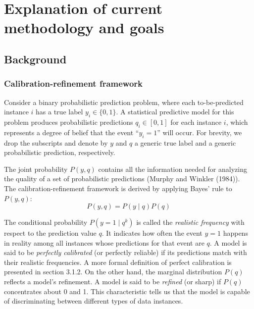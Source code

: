 \chapter{Explanation of current methodology and goals}
\section{Background}

\subsection{Calibration-refinement framework}

Consider a binary probabilistic prediction problem, where each to-be-predicted instance $i$ has a true label $y_i \in \{0, 1\}$. A statistical predictive model for this problem produces probabilistic predictions $q_i \in [0, 1]$ for each instance $i$, which represents a degree of belief that the event ``$y_i=1$'' will occur. For brevity, we drop the subscripts and denote by $y$ and $q$ a generic true label and a generic probabilistic prediction, respectively.  

The joint probability $P(y, q)$ contains all the information needed for analyzing the quality of a set of probabilistic predictions (Murphy and Winkler (1984)). The calibration-refinement framework is derived by applying Bayes' rule to $P(y, q)$:
\begin{equation}
  P(y, q) = P(y \mid q)P(q)
  \label{eqn:calib-ref-factor}
\end{equation}

The conditional probability $P(y = 1 \mid q^k)$ is called the \textit{realistic frequency} with respect to the prediction value $q$. It indicates how often the event $y=1$ happens in reality among all instances whose predictions for that event are $q$. A model is said to be \textit{perfectly calibrated} (or perfectly reliable) if its predictions match with their realistic frequencies. A more formal definition of perfect calibration is presented in section 3.1.2. On the other hand, the marginal distribution $P(q)$ reflects a model's refinement. A model is said to be \textit{refined} (or sharp) if $P(q)$ concentrates about 0 and 1. This characteristic tells us that the model is capable of discriminating between different types of data instances.   

